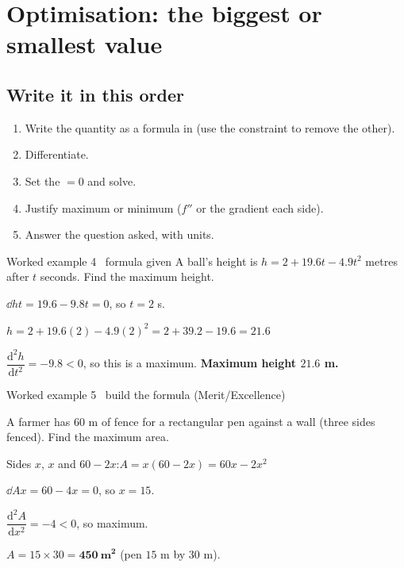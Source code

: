 \documentclass[11pt]{article}
\newlength\figunit
\begin{document}
\section{Optimisation: the biggest or smallest value}\label{opt}
\subsection{Write it in this order}
\begin{enumerate}[leftmargin=7mm, itemsep=1pt]
\item Write the quantity as a formula in  (use the constraint to remove the other).
\item Differentiate.
\item Set the \tderiv $=0$ and solve.
\item Justify maximum or minimum ($f''$ or the gradient each side).
\item Answer the question asked, with units.
\end{enumerate}

\begin{example}{Worked example 4 \textperiodcentered\ formula given}
A ball's height is $h=2+19.6t-4.9t^{2}$ metres after $t$ seconds. Find the maximum height.
\begin{steps}
\item $\dd{h}{t}=19.6-9.8t=0$, so $t=2$ s.
\item $h=2+19.6(2)-4.9(2)^{2}=2+39.2-19.6=21.6$
\item $\dfrac{\mathrm{d}^{2}h}{\mathrm{d}t^{2}}=-9.8<0$, so this is a maximum. \textbf{Maximum height $21.6$ m.}
\end{steps}
\end{example}

\begin{example}{Worked example 5 \textperiodcentered\ build the formula (Merit/Excellence)}
\begin{minipage}[t]{0.60\linewidth}
A farmer has $60$ m of fence for a rectangular pen against a wall (three sides fenced). Find the maximum area.
\begin{steps}
\item Sides $x$, $x$ and $60-2x$:\quad $A=x(60-2x)=60x-2x^{2}$
\item $\dd{A}{x}=60-4x=0$, so $x=15$.
\item $\dfrac{\mathrm{d}^{2}A}{\mathrm{d}x^{2}}=-4<0$, so maximum.
\item $A=15\times30=\mathbf{450\ m^{2}}$ (pen $15$ m by $30$ m).
\end{steps}
\end{minipage}\hfill
\begin{minipage}[t]{0.36\linewidth}\centering\vspace{2mm}
\setlength\figunit{8mm}

\end{minipage}
\end{example}
\end{document}
